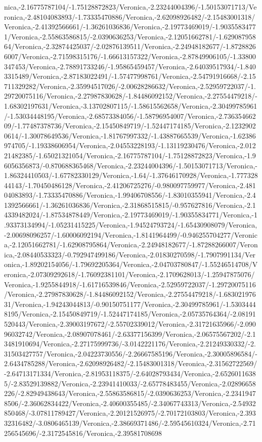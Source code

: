 {\begin{tikzternal}
nica,-2.16775787104/-1.75128872823/Veronica,-2.23244004396/-1.50153071713/Veronica,-2.48104083893/-1.73335470886/Veronica,-2.62098926482/-2.15483001318/Veronica,-2.41392566661/-1.36261036836/Veronica,-2.19773469019/-1.90355834771/Veronica,-2.55863586815/-2.0390636253/Veronica,-2.12051662781/-1.62908795864/Veronica,-2.32874425037/-2.02876139511/Veronica,-2.24948182677/-1.87288266007/Veronica,-2.71598315176/-1.66613157322/Veronica,-2.87849906105/-1.33800347453/Veronica,-2.78891733246/-1.95865459457/Veronica,-2.64039517934/-1.8403315489/Veronica,-2.87183022491/-1.57477998761/Veronica,-2.54791916668/-2.15711329282/Veronica,-2.35994517026/-2.00628286632/Veronica,-2.52959722037/-1.29720075116/Veronica,-2.27987830628/-1.84486092152/Veronica,-2.27554479218/-1.68302197631/Veronica,-3.13702807115/-1.58615562658/Veronica,-2.30499785961/-1.53034448195/Veronica,-2.68573384056/-1.58796954007/Veronica,-2.73635466209/-1.77487378736/Veronica,-2.15450849719/-1.52447174185/Veronica,-2.12329020614/-1.30078649536/Veronica,-1.81767997332/-1.43887665539/Veronica,-1.62386974705/-1.19338606954/Veronica,-2.04553228193/-1.13119230476/Veronica,-2.01221482385/-1.65021321054/Veronica,-2.16775787104/-1.75128872823/Veronica,-1.96056356873/-0.870688365468/Veronica,-2.23244004396/-1.50153071713/Veronica,-1.86324410503/-1.67782330129/Veronica,-1.64/-1.37646170928/Veronica,-1.77732844143/-1.70450486128/Veronica,-2.41206725276/-0.980097759977/Veronica,-2.48104083893/-1.73335470886/Veronica,-1.99406708556/-1.83010355941/Veronica,-2.41392566661/-1.36261036836/Veronica,-2.31868515815/-0.957627816/Veronica,-2.14339482024/-1.87534878449/Veronica,-2.19773469019/-1.90355834771/Veronica,-1.93373134994/-1.05231415225/Veronica,-1.94524793724/-1.65430908079/Veronica,-2.00698096257/-1.60006092194/Veronica,-1.8141964499/-0.946255704277/Veronica,-2.12051662781/-1.62908795864/Veronica,-2.24948182677/-1.87288266007/Veronica,-2.08440533323/-0.792947499186/Veronica,-2.01830270598/-1.7907991134/Veronica,-1.89202154056/-1.79692205364/Veronica,-2.04703780847/-1.55246514708/Veronica,-2.07309292618/-1.76092381101/Veronica,-2.1709628013/-1.25947875076/Veronica,-1.9255844918/-1.61716539846/Veronica,-2.52959722037/-1.29720075116/Veronica,-2.27987830628/-1.84486092152/Veronica,-2.27554479218/-1.68302197631/Veronica,-1.94243044813/-0.90150751177/Veronica,-2.30499785961/-1.53034448195/Veronica,-2.15450849719/-1.52447174185/Veronica,-2.05735764364/-2.08191520443/Veronica,-2.39003197672/-2.55702339012/Veronica,-2.31721635966/-2.09096032742/Veronica,-2.08907078461/-2.63377156399/Veronica,-2.06575567202/-2.13481910694/Veronica,-2.27175999736/-3.0142221176/Veronica,-2.21249330332/-2.31503427757/Veronica,-2.04223730556/-2.26667585196/Veronica,-2.30005896584/-2.6434785288/Veronica,-2.62098926482/-2.15483001318/Veronica,-2.31562722569/-2.64713171334/Veronica,-2.81953118375/-2.64028793434/Veronica,-2.65260116385/-2.83529139882/Veronica,-2.23941410033/-2.65778483455/Veronica,-2.02896658226/-2.82949438643/Veronica,-2.55863586815/-2.0390636253/Veronica,-2.23419478506/-2.36062834422/Veronica,-2.40600355485/-2.34067743313/Veronica,-2.54932850468/-3.07811789427/Veronica,-2.20121526975/-2.70172103803/Veronica,-2.39332316482/-3.0806465139/Veronica,-2.38669371486/-2.59545610324/Veronica,-2.71256545696/-2.3172545816/Veronica,-2.39581708698
\end{tikzternal}}
